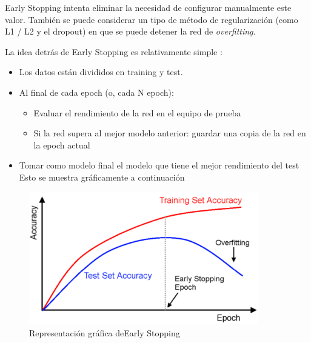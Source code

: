 Early Stopping intenta eliminar la necesidad de configurar manualmente este
valor. También se puede considerar un tipo de método de regularización (como L1 / L2
y el dropout) en que se puede detener la red de \textit{overfitting}. 

La idea detrás de Early Stopping es relativamente simple \cite{32Stopping}:


\begin{itemize}
 \item Los datos están divididos en training y test.
 \item Al final de cada epoch (o, cada N epoch):
  \begin{itemize}
  \item Evaluar el rendimiento de la red en el equipo de prueba
  \item Si la red supera al mejor modelo anterior: guardar una copia de la red en
  la epoch actual
  \end{itemize}
  \item Tomar como modelo final el modelo que tiene el mejor rendimiento del test
  Esto se muestra gráficamente a continuación
\end{itemize}


\begin{figure}[!htb]
    \centering
    \includegraphics[width=100mm]{Imagenes/early_stopping.png}
    \caption{Representación gráfica deEarly Stopping}
    \label{fig:early_stopping}
    
\end{figure}


